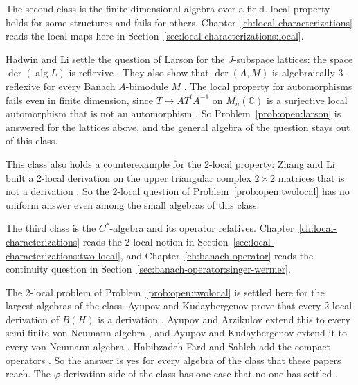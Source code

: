 The second class is the finite-dimensional algebra over a field.
local property holds for some structures and fails for others.
Chapter~\ref{ch:local-characterizations} reads the local maps here in
Section~\ref{sec:local-characterizations:local}.

Hadwin and Li settle the question of Larson for the $J$-subspace lattices: the
space $\operatorname{der}(\operatorname{alg}L)$ is reflexive
\cite[Theorem~2.15, p.~708]{HadwinLi2004}. They also show that
$\operatorname{der}(A,M)$ is algebraically $3$-reflexive for every Banach
$A$-bimodule $M$ \cite[Theorem~2.19, p.~710]{HadwinLi2004}. The local property
for automorphisms fails even in finite dimension, since $T\mapsto
AT^{t}A^{-1}$ on $M_n(\mathbb{C})$ is a surjective local automorphism that is
not an automorphism \cite[p.~713]{HadwinLi2004}. So
Problem~\ref{prob:open:larson} is answered for the lattices above, and the
general algebra of the question stays out of this class.

This class also holds a counterexample for the 2-local property: Zhang and Li
built a 2-local derivation on the upper triangular complex $2\times2$ matrices
that is not a derivation \cite[p.~15]{AyupovKudaybergenov2012}. So the 2-local
question of Problem~\ref{prob:open:twolocal} has no uniform answer even among
the small algebras of this class.

The third class is the $C^{*}$-algebra and its operator relatives.
Chapter~\ref{ch:local-characterizations} reads the 2-local notion in
Section~\ref{sec:local-characterizations:two-local}, and
Chapter~\ref{ch:banach-operator} reads the continuity question in
Section~\ref{sec:banach-operator:singer-wermer}.

The 2-local problem of Problem~\ref{prob:open:twolocal} is settled here for
the largest algebras of the class. Ayupov and Kudaybergenov prove that every
2-local derivation of $B(H)$ is a derivation \cite[Theorem~2.3,
p.~16]{AyupovKudaybergenov2012}. Ayupov and Arzikulov extend this to every
semi-finite von Neumann algebra \cite[p.~9]{AyupovArzikulov2014}, and Ayupov
and Kudaybergenov extend it to every von Neumann algebra \cite[Theorem~2.1,
p.~2]{AyupovKudaybergenov2015}. Habibzadeh Fard and Sahleh add the compact
operators \cite[Corollary~3.4, p.~6]{HabibzadehFardSahleh2019}. So the answer
is yes for every algebra of the class that these papers reach. The
$\varphi$-derivation side of the class has one case that no one has settled
\cite[Remark~5.3, p.~720]{BresarVillena2002}.

